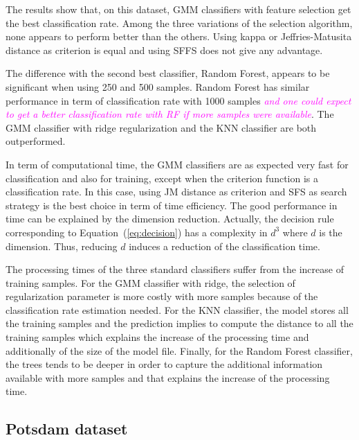 \documentclass[journal,10pt]{IEEEtran}
\newcommand{\rev}[1]{\textcolor{magenta}{\emph{#1}}}
\begin{document}
    
    


    The results show that, on this  dataset, GMM classifiers with feature selection get the best classification rate. Among the three variations of the selection algorithm, none appears to perform better than the others. Using kappa or Jeffries-Matusita distance as criterion is equal and using SFFS does not give any advantage.

    The difference with the second best classifier, Random Forest, appears to be significant when using 250 and 500 samples. Random Forest has similar performance in term of classification rate with 1000 samples \rev{and one could expect to get a better classification rate with RF if more samples were available}. The GMM classifier with ridge regularization and the KNN classifier are both outperformed.

    In term of computational time, the GMM classifiers are as expected very fast for classification and also for training, except when the criterion function is a classification rate. In this case, using JM distance as criterion and SFS as search strategy is the best choice in term of time efficiency. The good performance in time can be explained by the dimension reduction. Actually, the decision rule corresponding to Equation~(\ref{eq:decision}) has a complexity in $d^3$ where $d$ is the dimension. Thus, reducing $d$ induces a reduction of the classification time.

    The processing times of the three standard classifiers suffer from the increase of training samples. For the GMM classifier with ridge, the selection of regularization parameter is more costly with more samples because of the classification rate estimation needed. For the KNN classifier, the model stores all the training samples and the prediction implies to compute the distance to all the training samples which explains the increase of the processing time and additionally of the size of the model file. Finally, for the Random Forest classifier, the trees tends to be deeper in order to capture the additional information available with more samples and that explains the increase of the processing time.

    \subsection{Potsdam dataset}
\end{document}
